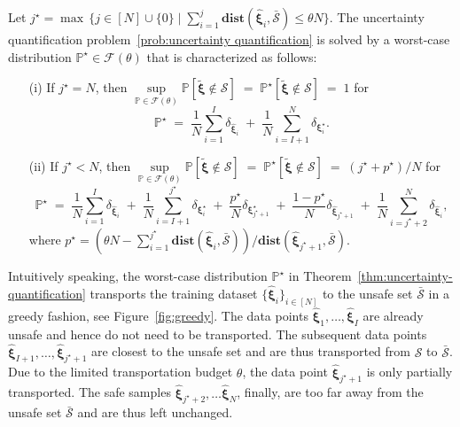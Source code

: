 \documentclass[nonblindrev]{informs2017}
\newcommand{\bmt}[1]{\tilde{\bm{#1}}}
\newcommand{\bmh}[1]{\hat{\bm{#1}}}
\newcommand{\1}[1]{\mathds{1}{\left(#1\right)}}
\begin{document}
\begin{theorem}\label{thm:uncertainty-quantification}
Let $j^\star = \max \, \{j \in [N] \cup \{ 0 \} \mid \sum_{i = 1}^j \mathbf{dist}(\bmh{\xi}_i, \bar{\mathcal{S}}) \leq \theta N \}$. The uncertainty quantification problem~\eqref{prob:uncertainty quantification} is solved by a worst-case distribution $\mathbb{P}^\star \in \mathcal{F} (\theta)$ that is characterized as follows:
\begin{enumerate}
\item[(i)] If $j^\star = N$, then $\sup\limits_{\mathbb{P} \in \mathcal{F}(\theta)} \mathbb{P}[\bmt{\xi} \notin \mathcal{S}] \; = \; \mathbb{P}^\star [\bmt{\xi} \notin \mathcal{S}] \; = \; 1$ for
\begin{equation*}
\mathbb{P}^\star \; = \; \dfrac{1}{N} \sum_{i = 1}^I \delta_{\bmh{\xi}_i} \; + \; \dfrac{1}{N} \sum_{i = I+1}^N \delta_{\bm{\xi}^\star_i}.
\end{equation*}
\item[(ii)] If $j^\star < N$, then $\sup\limits_{\mathbb{P} \in \mathcal{F}(\theta)} \mathbb{P}[\bmt{\xi} \notin \mathcal{S}] \; = \; \mathbb{P}^\star [\bmt{\xi} \notin \mathcal{S}] \; = \; (j^\star+ p^\star)/N$ for
\begin{equation*}
\mathbb{P}^\star \; = \; \dfrac{1}{N} \sum_{i = 1}^I \delta_{\bmh{\xi}_i} \; + \; \dfrac{1}{N} \sum_{i = I+1}^{j^\star} \delta_{\bm{\xi}^\star_i} \; + \; \dfrac{p^\star}{N} \delta_{\bm{\xi}^\star_{j^\star+1}} \; + \;  \dfrac{1-p^\star}{N}\delta_{\bmh{\xi}_{j^\star+1}} \; + \; \dfrac{1}{N} \sum_{i = j^\star+2}^N  \delta_{\bmh{\xi}_i},
\end{equation*}
where $p^\star = (\theta N - \sum_{i = 1}^{j^\star} \mathbf{dist}(\bmh{\xi}_i, \bar{\mathcal{S}})) / \mathbf{dist}(\bmh{\xi}_{j^\star+1}, \bar{\mathcal{S}})$.
\end{enumerate}
\end{theorem}

Intuitively speaking, the worst-case distribution $\mathbb{P}^\star$ in Theorem~\ref{thm:uncertainty-quantification} transports the training dataset $\{\bmh{\xi}_i\}_{i \in [N]}$ to the unsafe set $\bar{\mathcal{S}}$ in a greedy fashion, see Figure~\ref{fig:greedy}. The data points $\bmh{\xi}_1,\dots,\bmh{\xi}_I$ are already unsafe and hence do not need to be transported. The subsequent data points $\bmh{\xi}_{I+1}, \ldots, \bmh{\xi}_{j^\star + 1}$ are closest to the unsafe set and are thus transported from $\mathcal{S}$ to $\bar{\mathcal{S}}$. Due to the limited transportation budget $\theta$, the data point $\bmh{\xi}_{j^\star + 1}$ is only partially transported. The safe samples $\bmh{\xi}_{j^\star + 2}, \ldots \bmh{\xi}_N$, finally, are too far away from the unsafe set $\bar{\mathcal{S}}$ and are thus left unchanged.
\end{document}
